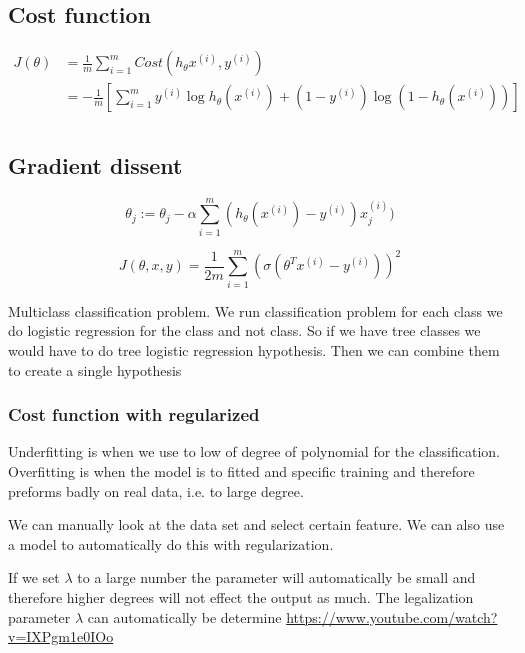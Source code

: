 \subsection{Cost function}
\begin{align*}
    J(\theta) &= \frac{1}{m}\sum_{i=1}^m Cost(h_{\theta}x^{(i)},y^{(i)}) \\
    &= -\frac{1}{m}\left[\sum_{i=1}^m y^{(i)}\log{h_{\theta}(x^{(i)}) + (1-y^{(i)})\log(1-h_{\theta}(x^{(i)}))}\right] \\
\end{align*}

\subsection{Gradient dissent}
\begin{equation*}
    \theta_j := \theta_j -\alpha\sum_{i=1}^m (h_{\theta}(x^{(i)}) - y^{(i)})x_j^{(i)})
\end{equation*}

\begin{equation*}
    J(\theta, x, y) = \frac{1}{2m}\sum_{i=1}^m\left( \sigma\left( \theta^Tx^{(i)} -y^{(i)} \right) \right)^2
\end{equation*}

Multiclass classification problem.
We run classification problem for each class we do logistic regression for 
the class and not class. So if we have tree classes we would have to do tree 
logistic regression hypothesis. Then we can combine them to create a single hypothesis


\subsubsection{Cost function with regularized}
Underfitting is when we use to low of degree of polynomial for the classification.
Overfitting is when the model is to fitted and specific training and therefore preforms badly 
on real data, i.e. to large degree.

We can manually look at the data set and select certain feature.
We can also use a model to automatically do this with regularization.

If we set $\lambda$ to a large number the parameter will automatically be small and 
therefore higher degrees will not effect the output as much.
The legalization parameter $\lambda$ can automatically be determine \newline
\url{https://www.youtube.com/watch?v=IXPgm1e0IOo}

